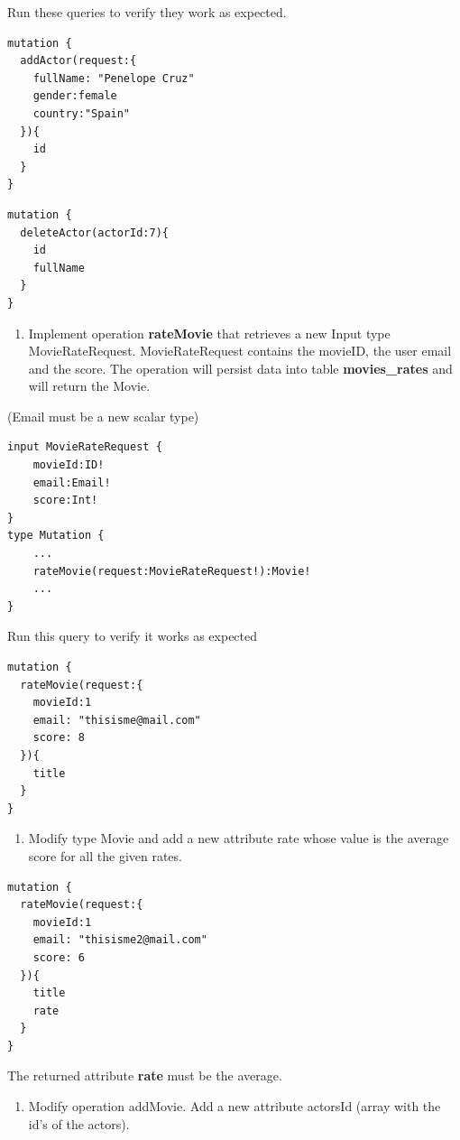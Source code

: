 \documentclass[]{book}
\providecommand{\tightlist}{%
  \setlength{\itemsep}{0pt}\setlength{\parskip}{0pt}}
\begin{document}
Run these queries to verify they work as expected.

\begin{verbatim}
mutation {
  addActor(request:{
    fullName: "Penelope Cruz"
    gender:female
    country:"Spain"
  }){
    id
  }
}
\end{verbatim}

\begin{verbatim}
mutation {
  deleteActor(actorId:7){
    id
    fullName
  }
}
\end{verbatim}

\begin{enumerate}
\def\labelenumi{\arabic{enumi}.}
\setcounter{enumi}{1}
\tightlist
\item
  Implement operation \textbf{rateMovie} that retrieves a new Input type
  MovieRateRequest. MovieRateRequest contains the movieID, the user
  email and the score. The operation will persist data into table
  \textbf{movies\_rates} and will return the Movie.
\end{enumerate}

(Email must be a new scalar type)

\begin{verbatim}
input MovieRateRequest {
    movieId:ID!
    email:Email!
    score:Int!
}
type Mutation {
    ...
    rateMovie(request:MovieRateRequest!):Movie!
    ...
}
\end{verbatim}

Run this query to verify it works as expected

\begin{verbatim}
mutation {
  rateMovie(request:{
    movieId:1
    email: "thisisme@mail.com"
    score: 8
  }){
    title
  }
}
\end{verbatim}

\begin{enumerate}
\def\labelenumi{\arabic{enumi}.}
\setcounter{enumi}{2}
\tightlist
\item
  Modify type Movie and add a new attribute rate whose value is the
  average score for all the given rates.
\end{enumerate}

\begin{verbatim}
mutation {
  rateMovie(request:{
    movieId:1
    email: "thisisme2@mail.com"
    score: 6
  }){
    title
    rate
  }
}
\end{verbatim}

The returned attribute \textbf{rate} must be the average.

\begin{enumerate}
\def\labelenumi{\arabic{enumi}.}
\setcounter{enumi}{3}
\tightlist
\item
  Modify operation addMovie. Add a new attribute actorsId (array with
  the id's of the actors).
\end{enumerate}
\end{document}
